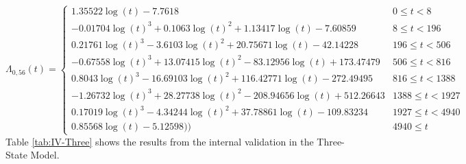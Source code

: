 \documentclass[12pt,PhD,twoside,openright]{muthesis}
\begin{document}
\begin{equation}
\Lambda_{0,56}(t)=\begin{cases} 1.35522\log(t)-7.7618 & 0 \le t < 8 \\ -0.01704\log(t)^3+0.1063\log(t)^2+1.13417\log(t)-7.60859 & 8 \le t < 196 \\ 0.21761\log(t)^3-3.6103\log(t)^2+20.75671\log(t)-42.14228 & 196 \le t < 506 \\ -0.67558\log(t)^3+13.07415\log(t)^2-83.12956\log(t)+173.47479 & 506 \le t < 816 \\ 0.8043\log(t)^3-16.69103\log(t)^2+116.42771\log(t)-272.49495 & 816 \le t < 1388 \\ -1.26732\log(t)^3+28.27738\log(t)^2-208.94656\log(t)+512.26643 & 1388 \le t < 1927 \\ 0.17019\log(t)^3-4.34244\log(t)^2+37.78861\log(t)-109.83234 & 1927 \le t < 4940 \\ 0.85568\log(t)-5.12598)) & 4940 \le t \label{eq:CH-Three-56}\end{cases}
\end{equation}
Table \ref{tab:IV-Three} shows the results from the internal validation in the Three-State Model.
\end{document}

